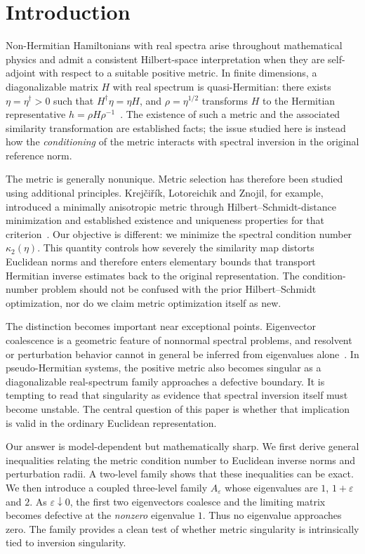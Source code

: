 \section{Introduction}
Non-Hermitian Hamiltonians with real spectra arise throughout mathematical physics and admit
a consistent Hilbert-space interpretation when they are self-adjoint with respect to a suitable
positive metric.  In finite dimensions, a diagonalizable matrix $H$ with real spectrum is
quasi-Hermitian: there exists $\eta=\eta^\dagger>0$ such that
$H^\dagger\eta=\eta H$, and $\rho=\eta^{1/2}$ transforms $H$ to the Hermitian representative
$h=\rho H\rho^{-1}$~\cite{Mostafazadeh2002I,Mostafazadeh2002II,Mostafazadeh2002III}.
The existence of such a metric and the associated similarity transformation are established
facts; the issue studied here is instead how the \emph{conditioning} of the metric interacts
with spectral inversion in the original reference norm.

The metric is generally nonunique.  Metric selection has therefore been studied using
additional principles.  Krej\v{c}i\v{r}\'ik, Lotoreichik and Znojil, for example, introduced a
minimally anisotropic metric through Hilbert--Schmidt-distance minimization and established
existence and uniqueness properties for that criterion~\cite{Krejcirik2018}.  Our objective is
different: we minimize the spectral condition number $\kappa_2(\eta)$.  This quantity controls
how severely the similarity map distorts Euclidean norms and therefore enters elementary
bounds that transport Hermitian inverse estimates back to the original representation.  The
condition-number problem should not be confused with the prior Hilbert--Schmidt optimization,
nor do we claim metric optimization itself as new.

The distinction becomes important near exceptional points.  Eigenvector coalescence is a
geometric feature of nonnormal spectral problems, and resolvent or perturbation behavior cannot
in general be inferred from eigenvalues alone~\cite{Trefethen2005}.  In pseudo-Hermitian
systems, the positive metric also becomes singular as a diagonalizable real-spectrum family
approaches a defective boundary.  It is tempting to read that singularity as evidence that
spectral inversion itself must become unstable.  The central question of this paper is whether
that implication is valid in the ordinary Euclidean representation.

Our answer is model-dependent but mathematically sharp.  We first derive general inequalities
relating the metric condition number to Euclidean inverse norms and perturbation radii.  A
two-level family shows that these inequalities can be exact.  We then introduce a coupled
three-level family $A_\varepsilon$ whose eigenvalues are $1$, $1+\varepsilon$ and $2$.
As $\varepsilon\downarrow0$, the first two eigenvectors coalesce and the limiting matrix becomes
defective at the \emph{nonzero} eigenvalue $1$.  Thus no eigenvalue approaches zero.  The family
provides a clean test of whether metric singularity is intrinsically tied to inversion
singularity.

